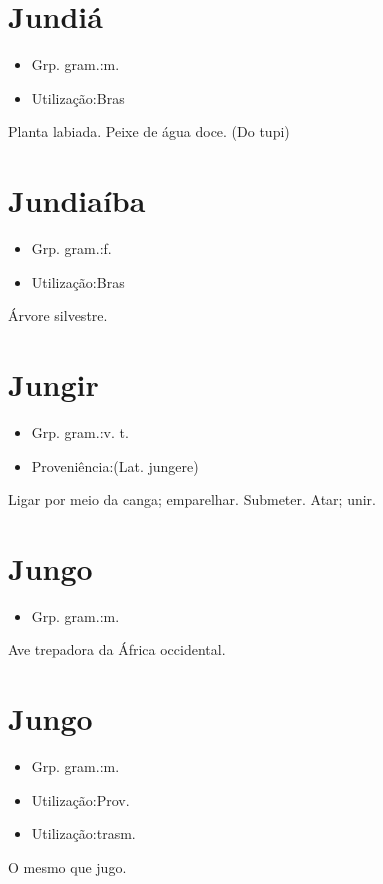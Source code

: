 \documentclass{article}
\begin{document}
\section{Jundiá}
\begin{itemize}
\item {Grp. gram.:m.}
\end{itemize}
\begin{itemize}
\item {Utilização:Bras}
\end{itemize}
Planta labiada.
Peixe de água doce.
(Do tupi)
\section{Jundiaíba}
\begin{itemize}
\item {Grp. gram.:f.}
\end{itemize}
\begin{itemize}
\item {Utilização:Bras}
\end{itemize}
Árvore silvestre.
\section{Jungir}
\begin{itemize}
\item {Grp. gram.:v. t.}
\end{itemize}
\begin{itemize}
\item {Proveniência:(Lat. \textunderscore jungere\textunderscore )}
\end{itemize}
Ligar por meio da canga; emparelhar.
Submeter.
Atar; unir.
\section{Jungo}
\begin{itemize}
\item {Grp. gram.:m.}
\end{itemize}
Ave trepadora da África occidental.
\section{Jungo}
\begin{itemize}
\item {Grp. gram.:m.}
\end{itemize}
\begin{itemize}
\item {Utilização:Prov.}
\end{itemize}
\begin{itemize}
\item {Utilização:trasm.}
\end{itemize}
O mesmo que \textunderscore jugo\textunderscore .
\end{document}
